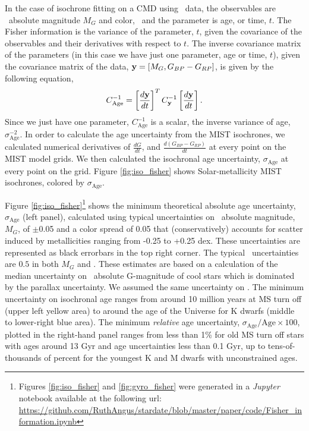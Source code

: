 In the case of isochrone fitting on a CMD using \Gaia\ data, the observables
are \Gaia\ absolute magnitude $M_G$ and color, \gcolor\ and the parameter is
age, or time, $t$.
The Fisher information is the variance of the parameter, $t$, given the
covariance of the observables and their derivatives with respect to $t$.
The inverse covariance matrix of the parameters (in this case we have just one
parameter, age or time, $t$), given the covariance matrix of the data,
${\bf y} = [M_G, G_{BP} - G_{RP}]$, is given by the following equation,
\begin{equation}
    C_{\mathrm{Age}}^{-1} = \left[\frac{d{\bf y}}{dt}\right]^T
    C_{\bf y}^{-1} \left[\frac{d{\bf y}}{dt}\right].
\end{equation}
Since we just have one parameter, $C_\mathrm{Age}^{-1}$ is a scalar, the
inverse variance of age, $\sigma_{\mathrm{Age}}^{-2}$.
In order to calculate the age uncertainty from the MIST isochrones, we
calculated numerical derivatives of $\frac{dG}{dt}$,
and $\frac{d(G_{BP} - G_{RP})}{dt}$ at every point on the MIST model grids.
We then calculated the isochronal age uncertainty, $\sigma_{\mathrm{Age}}$ at
every point on the grid.
Figure \ref{fig:iso_fisher} shows Solar-metallicity MIST isochrones, colored
by $\sigma_{\mathrm{Age}}$.

Figure \ref{fig:iso_fisher}\footnote{Figures \ref{fig:iso_fisher} and
\ref{fig:gyro_fisher} were generated in a {\it Jupyter} notebook available at
the following url:
\url{https://github.com/RuthAngus/stardate/blob/master/paper/code/Fisher_information.ipynb}}
shows the minimum theoretical absolute age uncertainty,
$\sigma_{\mathrm{Age}}$ (left panel), calculated using typical uncertainties
on \Gaia\ absolute magnitude, $M_G$, of $\pm$0.05 and a color spread of 0.05
that (conservatively) accounts for scatter induced by metallicities ranging
from -0.25 to +0.25 dex.
These uncertainties are represented as black errorbars in the top right
corner.
The typical \Gaia\ uncertainties are $0.5$ in both $M_G$ and \gcolor.
These estimates are based on a calculation of the median uncertainty on \Gaia\
absolute G-magnitude of cool stars which is dominated by the parallax
uncertainty.
We assumed the same uncertainty on \gcolor.
The minimum uncertainty on isochronal age ranges from around 10 million years
at MS turn off (upper left yellow area) to around the age of the Universe for
K dwarfs (middle to lower-right blue area).
The minimum {\it relative} age uncertainty,
$\sigma_{\mathrm{Age}}/\mathrm{Age} \times 100$, plotted in the right-hand
panel ranges from less than 1\% for old MS turn off stars with ages
around 13 Gyr and age uncertainties less than 0.1 Gyr, up to tens-of-thousands
of percent for the youngest K and M dwarfs with unconstrained ages.

